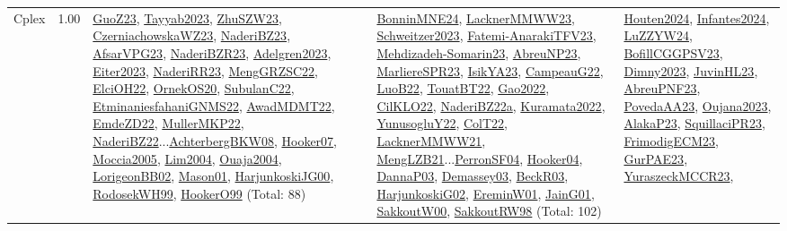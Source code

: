 {\begin{longtable}{p{3cm}r>{\raggedright\arraybackslash}p{6cm}>{\raggedright\arraybackslash}p{6cm}>{\raggedright\arraybackslash}p{8cm}}
\index{Cplex}\index{CPSystems!Cplex}Cplex &  1.00 & \hyperref[detail:GuoZ23]{GuoZ23}, \hyperref[detail:Tayyab2023]{Tayyab2023}, \hyperref[detail:ZhuSZW23]{ZhuSZW23}, \hyperref[detail:CzerniachowskaWZ23]{CzerniachowskaWZ23}, \hyperref[detail:NaderiBZ23]{NaderiBZ23}, \hyperref[detail:AfsarVPG23]{AfsarVPG23}, \hyperref[detail:NaderiBZR23]{NaderiBZR23}, \hyperref[detail:Adelgren2023]{Adelgren2023}, \hyperref[detail:Eiter2023]{Eiter2023}, \hyperref[detail:NaderiRR23]{NaderiRR23}, \hyperref[detail:MengGRZSC22]{MengGRZSC22}, \hyperref[detail:ElciOH22]{ElciOH22}, \hyperref[detail:OrnekOS20]{OrnekOS20}, \hyperref[detail:SubulanC22]{SubulanC22}, \hyperref[detail:EtminaniesfahaniGNMS22]{EtminaniesfahaniGNMS22}, \hyperref[detail:AwadMDMT22]{AwadMDMT22}, \hyperref[detail:EmdeZD22]{EmdeZD22}, \hyperref[detail:MullerMKP22]{MullerMKP22}, \hyperref[detail:NaderiBZ22]{NaderiBZ22}...\hyperref[detail:AchterbergBKW08]{AchterbergBKW08}, \hyperref[detail:Hooker07]{Hooker07}, \hyperref[detail:Moccia2005]{Moccia2005}, \hyperref[detail:Lim2004]{Lim2004}, \hyperref[detail:Ouaja2004]{Ouaja2004}, \hyperref[detail:LorigeonBB02]{LorigeonBB02}, \hyperref[detail:Mason01]{Mason01}, \hyperref[detail:HarjunkoskiJG00]{HarjunkoskiJG00}, \hyperref[detail:RodosekWH99]{RodosekWH99}, \hyperref[detail:HookerO99]{HookerO99} (Total: 88) & \hyperref[detail:BonninMNE24]{BonninMNE24}, \hyperref[detail:LacknerMMWW23]{LacknerMMWW23}, \hyperref[detail:Schweitzer2023]{Schweitzer2023}, \hyperref[detail:Fatemi-AnarakiTFV23]{Fatemi-AnarakiTFV23}, \hyperref[detail:Mehdizadeh-Somarin23]{Mehdizadeh-Somarin23}, \hyperref[detail:AbreuNP23]{AbreuNP23}, \hyperref[detail:MarliereSPR23]{MarliereSPR23}, \hyperref[detail:IsikYA23]{IsikYA23}, \hyperref[detail:CampeauG22]{CampeauG22}, \hyperref[detail:LuoB22]{LuoB22}, \hyperref[detail:TouatBT22]{TouatBT22}, \hyperref[detail:Gao2022]{Gao2022}, \hyperref[detail:CilKLO22]{CilKLO22}, \hyperref[detail:NaderiBZ22a]{NaderiBZ22a}, \hyperref[detail:Kuramata2022]{Kuramata2022}, \hyperref[detail:YunusogluY22]{YunusogluY22}, \hyperref[detail:ColT22]{ColT22}, \hyperref[detail:LacknerMMWW21]{LacknerMMWW21}, \hyperref[detail:MengLZB21]{MengLZB21}...\hyperref[detail:PerronSF04]{PerronSF04}, \hyperref[detail:Hooker04]{Hooker04}, \hyperref[detail:DannaP03]{DannaP03}, \hyperref[detail:Demassey03]{Demassey03}, \hyperref[detail:BeckR03]{BeckR03}, \hyperref[detail:HarjunkoskiG02]{HarjunkoskiG02}, \hyperref[detail:EreminW01]{EreminW01}, \hyperref[detail:JainG01]{JainG01}, \hyperref[detail:SakkoutW00]{SakkoutW00}, \hyperref[detail:SakkoutRW98]{SakkoutRW98} (Total: 102) & \hyperref[detail:Houten2024]{Houten2024}, \hyperref[detail:Infantes2024]{Infantes2024}, \hyperref[detail:LuZZYW24]{LuZZYW24}, \hyperref[detail:BofillCGGPSV23]{BofillCGGPSV23}, \hyperref[detail:Dimny2023]{Dimny2023}, \hyperref[detail:JuvinHL23]{JuvinHL23}, \hyperref[detail:AbreuPNF23]{AbreuPNF23}, \hyperref[detail:PovedaAA23]{PovedaAA23}, \hyperref[detail:Oujana2023]{Oujana2023}, \hyperref[detail:AlakaP23]{AlakaP23}, \hyperref[detail:SquillaciPR23]{SquillaciPR23}, \hyperref[detail:FrimodigECM23]{FrimodigECM23}, \hyperref[detail:GurPAE23]{GurPAE23}, \hyperref[detail:YuraszeckMCCR23]{YuraszeckMCCR23}, 
\end{longtable}}
